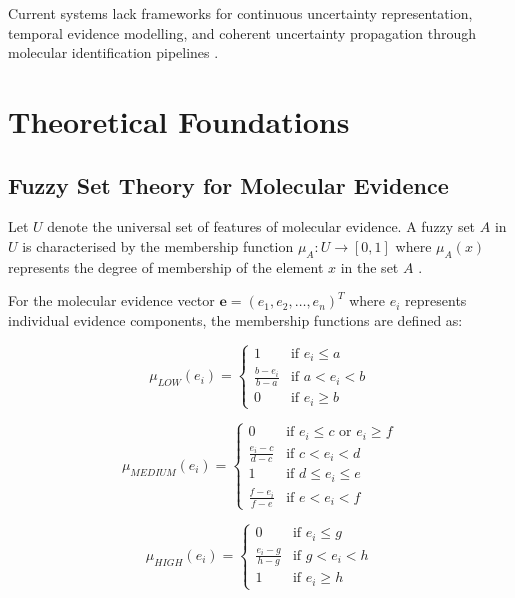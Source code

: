 \documentclass[12pt,a4paper]{article}
\begin{document}
Current systems lack frameworks for continuous uncertainty representation, temporal evidence modelling, and coherent uncertainty propagation through molecular identification pipelines \cite{boulder2019uncertainty, rogers2019molecular}.


\section{Theoretical Foundations}

\subsection{Fuzzy Set Theory for Molecular Evidence}

Let $U$ denote the universal set of features of molecular evidence. A fuzzy set $A$ in $U$ is characterised by the membership function $\mu_A: U \rightarrow [0,1]$ where $\mu_A(x)$ represents the degree of membership of the element $x$ in the set $A$ \cite{zadeh1965fuzzy}.

For the molecular evidence vector $\mathbf{e} = (e_1, e_2, \ldots, e_n)^T$ where $e_i$ represents individual evidence components, the membership functions are defined as:

\begin{equation}
\mu_{LOW}(e_i) = \begin{cases}
1 & \text{if } e_i \leq a \\
\frac{b - e_i}{b - a} & \text{if } a < e_i < b \\
0 & \text{if } e_i \geq b
\end{cases}
\end{equation}

\begin{equation}
\mu_{MEDIUM}(e_i) = \begin{cases}
0 & \text{if } e_i \leq c \text{ or } e_i \geq f \\
\frac{e_i - c}{d - c} & \text{if } c < e_i < d \\
1 & \text{if } d \leq e_i \leq e \\
\frac{f - e_i}{f - e} & \text{if } e < e_i < f
\end{cases}
\end{equation}

\begin{equation}
\mu_{HIGH}(e_i) = \begin{cases}
0 & \text{if } e_i \leq g \\
\frac{e_i - g}{h - g} & \text{if } g < e_i < h \\
1 & \text{if } e_i \geq h
\end{cases}
\end{equation}
\end{document}
